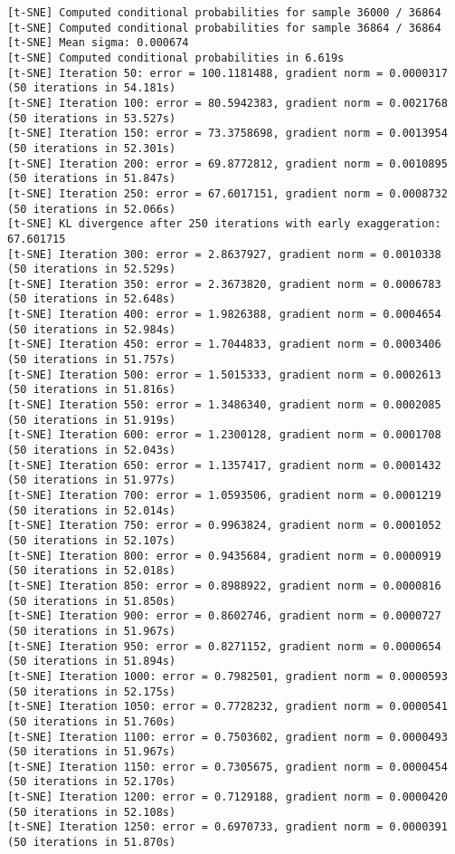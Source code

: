 \documentclass[11pt]{article}
\begin{document}
\begin{Verbatim}[commandchars=\\\{\}]
[t-SNE] Computed conditional probabilities for sample 36000 / 36864
[t-SNE] Computed conditional probabilities for sample 36864 / 36864
[t-SNE] Mean sigma: 0.000674
[t-SNE] Computed conditional probabilities in 6.619s
[t-SNE] Iteration 50: error = 100.1181488, gradient norm = 0.0000317 (50 iterations in 54.181s)
[t-SNE] Iteration 100: error = 80.5942383, gradient norm = 0.0021768 (50 iterations in 53.527s)
[t-SNE] Iteration 150: error = 73.3758698, gradient norm = 0.0013954 (50 iterations in 52.301s)
[t-SNE] Iteration 200: error = 69.8772812, gradient norm = 0.0010895 (50 iterations in 51.847s)
[t-SNE] Iteration 250: error = 67.6017151, gradient norm = 0.0008732 (50 iterations in 52.066s)
[t-SNE] KL divergence after 250 iterations with early exaggeration: 67.601715
[t-SNE] Iteration 300: error = 2.8637927, gradient norm = 0.0010338 (50 iterations in 52.529s)
[t-SNE] Iteration 350: error = 2.3673820, gradient norm = 0.0006783 (50 iterations in 52.648s)
[t-SNE] Iteration 400: error = 1.9826388, gradient norm = 0.0004654 (50 iterations in 52.984s)
[t-SNE] Iteration 450: error = 1.7044833, gradient norm = 0.0003406 (50 iterations in 51.757s)
[t-SNE] Iteration 500: error = 1.5015333, gradient norm = 0.0002613 (50 iterations in 51.816s)
[t-SNE] Iteration 550: error = 1.3486340, gradient norm = 0.0002085 (50 iterations in 51.919s)
[t-SNE] Iteration 600: error = 1.2300128, gradient norm = 0.0001708 (50 iterations in 52.043s)
[t-SNE] Iteration 650: error = 1.1357417, gradient norm = 0.0001432 (50 iterations in 51.977s)
[t-SNE] Iteration 700: error = 1.0593506, gradient norm = 0.0001219 (50 iterations in 52.014s)
[t-SNE] Iteration 750: error = 0.9963824, gradient norm = 0.0001052 (50 iterations in 52.107s)
[t-SNE] Iteration 800: error = 0.9435684, gradient norm = 0.0000919 (50 iterations in 52.018s)
[t-SNE] Iteration 850: error = 0.8988922, gradient norm = 0.0000816 (50 iterations in 51.850s)
[t-SNE] Iteration 900: error = 0.8602746, gradient norm = 0.0000727 (50 iterations in 51.967s)
[t-SNE] Iteration 950: error = 0.8271152, gradient norm = 0.0000654 (50 iterations in 51.894s)
[t-SNE] Iteration 1000: error = 0.7982501, gradient norm = 0.0000593 (50 iterations in 52.175s)
[t-SNE] Iteration 1050: error = 0.7728232, gradient norm = 0.0000541 (50 iterations in 51.760s)
[t-SNE] Iteration 1100: error = 0.7503602, gradient norm = 0.0000493 (50 iterations in 51.967s)
[t-SNE] Iteration 1150: error = 0.7305675, gradient norm = 0.0000454 (50 iterations in 52.170s)
[t-SNE] Iteration 1200: error = 0.7129188, gradient norm = 0.0000420 (50 iterations in 52.108s)
[t-SNE] Iteration 1250: error = 0.6970733, gradient norm = 0.0000391 (50 iterations in 51.870s)

\end{Verbatim}
\end{document}
